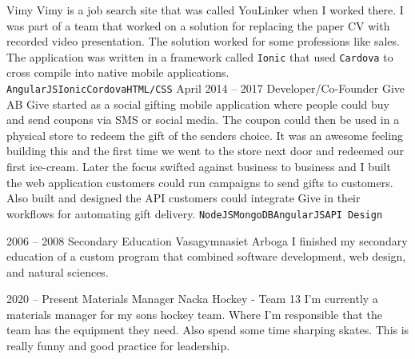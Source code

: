 \documentclass[9pt]{developercv} %
\begin{document}
\begin{entrylist}
    {Vimy}
    {Vimy is a job search site that was called YouLinker when I worked there.
      I was part of a team that worked on a solution for replacing the paper CV
      with recorded video presentation. The solution worked for some professions like
      sales. The application was written in a framework called \texttt{Ionic} that
      used \texttt{Cardova} to cross compile into native mobile applications.\\
      \texttt{AngularJS}\slashsep\texttt{Ionic}\slashsep\texttt{Cordova}\slashsep\texttt{HTML/CSS}}
  \entry
    {April 2014 -- 2017}
    {Developer/Co-Founder}
    {Give AB}
    {Give started as a social gifting mobile application where people could buy
      and send coupons via SMS or social media. The coupon could then be used in
      a physical store to redeem the gift of the senders choice. It was an awesome
      feeling building this and the first time we went to the store next door and
      redeemed our first ice-cream. Later the focus swifted against business to business
      and I built the web application customers could run campaigns to send gifts
      to customers. Also built and designed the API customers could integrate Give in
      their workflows for automating gift delivery.
      \texttt{NodeJS}\slashsep\texttt{MongoDB}\slashsep\texttt{AngularJS}\slashsep\texttt{API Design}}
\end{entrylist}



\begin{entrylist}
  \entry
    {2006 -- 2008}
    {Secondary Education}
    {Vasagymnasiet Arboga}
    {I finished my secondary education of a custom program that combined
      software development, web design, and natural sciences.}
\end{entrylist}



\begin{entrylist}
  \entry
    {2020 -- Present}
    {Materials Manager}
    {Nacka Hockey - Team 13}
    {I'm currently a materials manager for my sons hockey team. Where I'm
      responsible that the team has the equipment they need. Also spend some
      time sharping skates. This is really funny and good practice for leadership.}
\end{entrylist}
\end{document}

